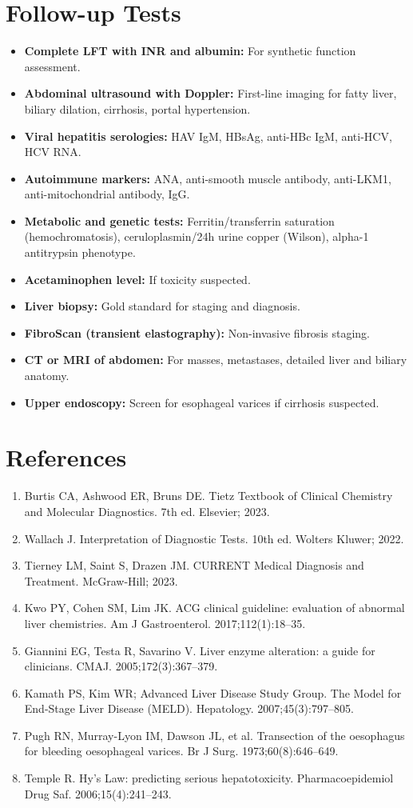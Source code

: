 \section*{Follow-up Tests}
\begin{itemize}
  \item \textbf{Complete LFT with INR and albumin:} For synthetic function assessment.
  \item \textbf{Abdominal ultrasound with Doppler:} First-line imaging for fatty liver, biliary dilation, cirrhosis, portal hypertension.
  \item \textbf{Viral hepatitis serologies:} HAV IgM, HBsAg, anti-HBc IgM, anti-HCV, HCV RNA.
  \item \textbf{Autoimmune markers:} ANA, anti-smooth muscle antibody, anti-LKM1, anti-mitochondrial antibody, IgG.
  \item \textbf{Metabolic and genetic tests:} Ferritin/transferrin saturation (hemochromatosis), ceruloplasmin/24h urine copper (Wilson), alpha-1 antitrypsin phenotype.
  \item \textbf{Acetaminophen level:} If toxicity suspected.
  \item \textbf{Liver biopsy:} Gold standard for staging and diagnosis.
  \item \textbf{FibroScan (transient elastography):} Non-invasive fibrosis staging.
  \item \textbf{CT or MRI of abdomen:} For masses, metastases, detailed liver and biliary anatomy.
  \item \textbf{Upper endoscopy:} Screen for esophageal varices if cirrhosis suspected.
\end{itemize}

\section*{References}
\begin{enumerate}
  \item Burtis CA, Ashwood ER, Bruns DE. Tietz Textbook of Clinical Chemistry and Molecular Diagnostics. 7th ed. Elsevier; 2023.
  \item Wallach J. Interpretation of Diagnostic Tests. 10th ed. Wolters Kluwer; 2022.
  \item Tierney LM, Saint S, Drazen JM. CURRENT Medical Diagnosis and Treatment. McGraw-Hill; 2023.
  \item Kwo PY, Cohen SM, Lim JK. ACG clinical guideline: evaluation of abnormal liver chemistries. Am J Gastroenterol. 2017;112(1):18--35.
  \item Giannini EG, Testa R, Savarino V. Liver enzyme alteration: a guide for clinicians. CMAJ. 2005;172(3):367--379.
  \item Kamath PS, Kim WR; Advanced Liver Disease Study Group. The Model for End-Stage Liver Disease (MELD). Hepatology. 2007;45(3):797--805.
  \item Pugh RN, Murray-Lyon IM, Dawson JL, et al. Transection of the oesophagus for bleeding oesophageal varices. Br J Surg. 1973;60(8):646--649.
  \item Temple R. Hy's Law: predicting serious hepatotoxicity. Pharmacoepidemiol Drug Saf. 2006;15(4):241--243.
\end{enumerate}

\clearpage
